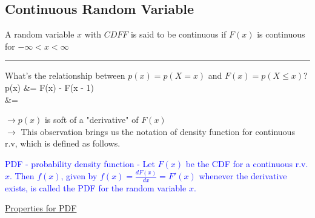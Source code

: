 \documentclass[12pt]{article}
\newcommand{\ddef}[1]{\textcolor{blue}{#1}}
\newcommand{\divider}[0]{\par\textcolor{lightgray}{\rule{\textwidth}{0.1pt}}}
\newenvironment{eqn}{\equation\alignedat{3}}{\endalignedat\endequation}
\begin{document}
\subsection{Continuous Random Variable}

A random variable $x$ with $CDF F$ is said to be continuous if $F(x)$ is continuous for $-\infty < x < \infty$

\divider

What's the relationship between $p(x) = p(X = x)$ and $F(x) = p(X \le x)$? \\

\begin{eqn}
	p(x) &= F(x) - F(x - 1) \\
	&= 
\end{eqn}

$\rightarrow p(x)$ is soft of a "derivative" of $F(x)$ \\
$\rightarrow$ This observation brings us the notation of density function for continuous r.v, which is defined as follows.

\ddef{PDF - probability density function - Let $F(x)$ be the CDF for a continuous r.v. $x$. Then $f(x)$, given by $f(x) = \frac{dF(x)}{dx} = F'(x)$ whenever the derivative exists, is called the PDF for the random variable $x$.}

\underline{Properties for PDF}
\end{document}
